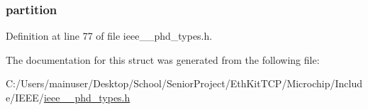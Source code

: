 \subsubsection[{partition}]{ partition}\label{struct___t_y_p_e_a620c25fa7766fb56ad6e76a5afb6f9d9}


Definition at line 77 of file ieee\+\_\+\_\+phd\+\_\+types.\+h.



The documentation for this struct was generated from the following file\+:\begin{DoxyCompactItemize}
\item 
C\+:/\+Users/mainuser/\+Desktop/\+School/\+Senior\+Project/\+Eth\+Kit\+T\+C\+P/\+Microchip/\+Include/\+I\+E\+E\+E/\hyperlink{ieee__11073__phd__types_8h}{ieee\+\_\+\_\+phd\+\_\+types.\+h}\end{DoxyCompactItemize}
